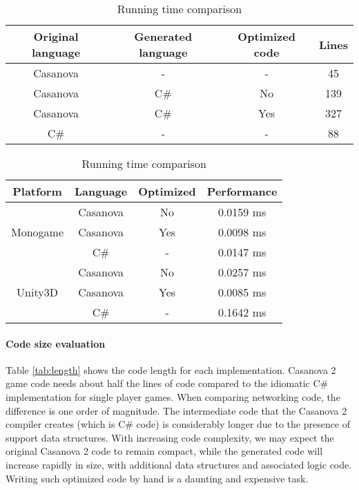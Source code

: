 \begin{table}[!ht]
\caption{Code lines comparison}
\tiny
\label{tab:length}
\centering
\begin{tabular}{ @{}|c|c|c|c|@{} }
\hline
  Original language & Generated language & Optimized code & Lines \\ \hline
  Casanova & - & - & 45 \\
  Casanova & C\# & No & 139 \\
  Casanova & C\# & Yes & 327 \\
  C\# & - & - & 88 \\ \hline
\hline
\end{tabular}
\vspace{5pt}
\caption{Running time comparison}
\tiny
\label{tab:times}
\centering
\begin{tabular}{ @{}|c|c|c|c|@{} }
\hline
 Platform & Language & Optimized & Performance\\ \hline
\multirow{3}{*}{Monogame}
  & Casanova & No & 0.0159 ms\\
  & Casanova & Yes & 0.0098 ms\\
  & C\# &   - & 0.0147 ms\\ \hline
\multirow{3}{*}{Unity3D}
  & Casanova & No & 0.0257 ms\\
  & Casanova & Yes & 0.0085 ms\\
  & C\# &   - & 0.1642 ms\\ \hline
\hline
\end{tabular}
\end{table}

\paragraph*{Code size evaluation}
Table \ref{tab:length} shows the code length for each implementation. Casanova 2 game code needs about half the lines of code compared to the idiomatic C\# implementation for single player games. When comparing networking code, the difference is one order of magnitude. The intermediate code that the Casanova 2 compiler creates (which is C\# code) is considerably longer due to the presence of support data structures. With increasing code complexity, we may expect the original Casanova 2 code to remain compact, while the generated code will increase rapidly in size, with additional data structures and associated logic code. Writing such optimized code by hand is a daunting and expensive task.